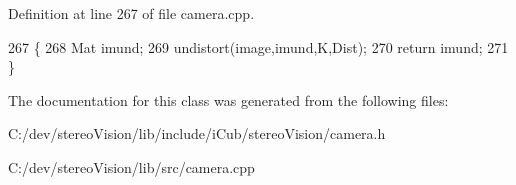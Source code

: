 Definition at line 267 of file camera.\+cpp.


\begin{DoxyCode}
267                                     \{
268     Mat imund;
269     undistort(image,imund,K,Dist);
270     \textcolor{keywordflow}{return} imund;
271 \}
\end{DoxyCode}


The documentation for this class was generated from the following files\+:\begin{DoxyCompactItemize}
\item 
C\+:/dev/stereo\+Vision/lib/include/i\+Cub/stereo\+Vision/camera.\+h\item 
C\+:/dev/stereo\+Vision/lib/src/camera.\+cpp\end{DoxyCompactItemize}
